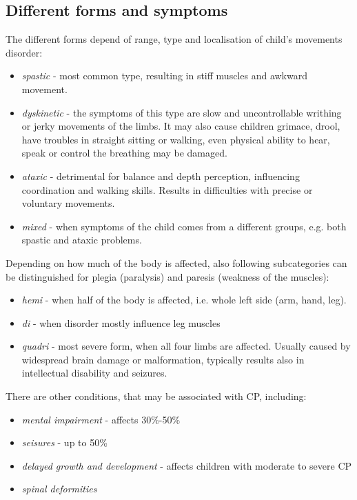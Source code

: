 \subsection{Different forms and symptoms}
The different forms depend of range, type and localisation of child's movements disorder:
\begin{itemize}
\item \emph{spastic} - most common type, resulting in stiff muscles and awkward movement.
\item \emph{dyskinetic} - the symptoms of this type are slow and uncontrollable writhing or jerky movements of the limbs. It may also cause children grimace, drool, have troubles in straight sitting or walking, even physical ability to hear, speak or control the breathing may be damaged. 
\item \emph{ataxic} - detrimental for balance and depth perception, influencing coordination and walking skills. Results in difficulties with precise or voluntary movements. 
\item \emph{mixed} - when symptoms of the child comes from a different groups, e.g. both spastic and ataxic problems. 
\end{itemize}


Depending on how much of the body is affected, also following subcategories can be distinguished for plegia (paralysis) and paresis (weakness of the muscles):
\begin{itemize}
\item \emph{hemi} - when half of the body is affected, i.e. whole left side (arm, hand, leg).
\item \emph{di} - when disorder mostly influence leg muscles
\item \emph{quadri} - most severe form, when all four limbs are affected. Usually caused by widespread brain damage or malformation, typically results also in intellectual disability and seizures. 
\end{itemize}


There are other conditions, that may be associated with CP, including:
\begin{itemize}
\item \emph{mental impairment} - affects 30\%-50\%
\item \emph{seisures} - up to 50\%
\item \emph{delayed growth and development} - affects children with moderate to severe CP
\item \emph{spinal deformities}
\end{itemize}


